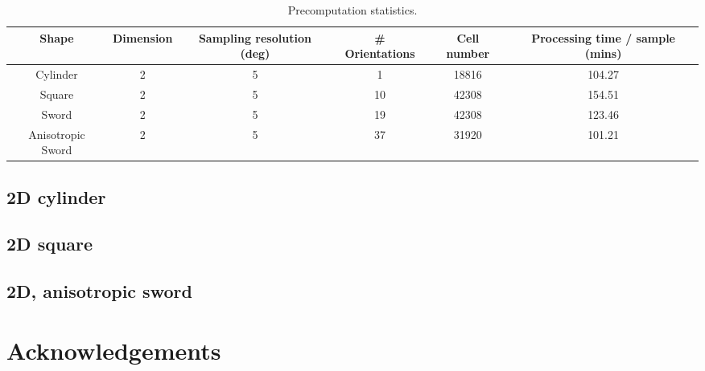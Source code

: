 \documentclass[tog]{acmsiggraph}
\begin{document}
\begin{table}[t]
  \centering
  \caption{Precomputation statistics.}
  \begin{tabular}{*{6}{c}}
    \hline
    \textbf{Shape} & \textbf{Dimension} & \textbf{Sampling resolution (deg)} & \textbf{\# Orientations} & \textbf{Cell number} & \textbf{Processing time / sample (mins)} \\
    \hline
    Cylinder & 2 & 5 & 1 & 18816 & 104.27 \\
    \hline
    Square & 2 & 5 & 10 & 42308 & 154.51 \\
    \hline
    Sword & 2 & 5 & 19 & 42308 & 123.46 \\
    \hline
    Anisotropic Sword & 2 & 5 & 37 & 31920 & 101.21 \\
    \hline
\end{tabular} \label{table:runstats}

\end{table}


\subsection{2D cylinder} 

\subsection{2D square} 

\subsection{2D, anisotropic sword} 


\section*{Acknowledgements}




\end{document}
